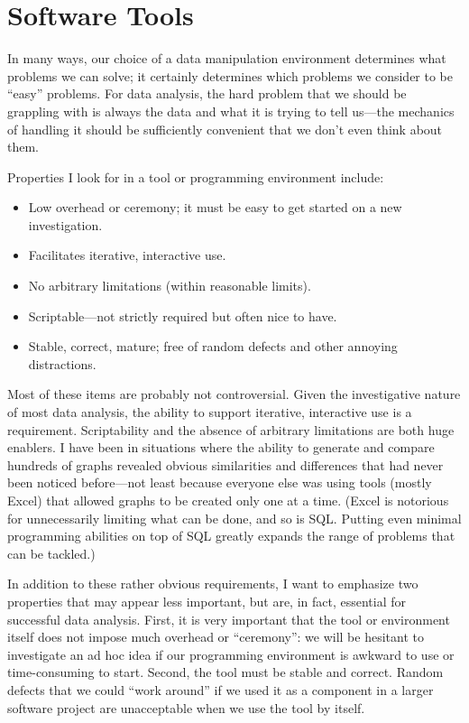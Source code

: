 \vspace*{-6pt}
\section{Software Tools}

 
In many ways, our choice of a data manipulation environment determines
what problems we can solve; it certainly determines which problems we
consider to be ``easy'' problems.  For data analysis, the hard problem
that we should be grappling with is always the data and what it is
trying to tell us---the mechanics of handling it should be
sufficiently convenient that we don't even think about them.

Properties I look for in a tool or programming environment include:

\begin{itemize}
\item Low overhead or ceremony; it must be easy to get started on a
  new investigation.
\item Facilitates iterative, interactive use.\pagebreak

\item No arbitrary limitations (within reasonable limits).
\item Scriptable---not strictly required but often nice to have.
\item Stable, correct, mature; free of random defects and other
  annoying distractions.
\end{itemize}

Most of these items are probably not controversial.  Given the
investigative nature of most data analysis, the ability to support
iterative, interactive use is a requirement.  Scriptability and the
absence of arbitrary limitations are both huge enablers. I have been
in situations where the ability to generate and compare hundreds of
graphs revealed obvious similarities and differences that had never
been noticed before---not least because everyone else was using tools
(mostly Excel) that allowed graphs to be created only one at a time.
(Excel is notorious for unnecessarily limiting what can be done, and
so is SQL. Putting even minimal programming abilities on top of SQL
greatly expands the range of problems that can be tackled.)

In addition to these rather obvious requirements, I want to emphasize
two properties that may appear less important, but are, in fact,
essential for successful data analysis. First, it is very important
that the tool or environment itself does not impose much overhead or
``ceremony'': we will be hesitant to investigate an ad hoc idea if our
programming environment is awkward to use or time-consuming to start.
Second, the tool must be stable and correct. Random defects that we
could ``work around'' if we used it as a component in a larger
software project are unacceptable when we use the tool by itself.

